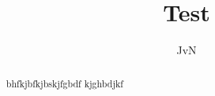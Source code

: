 \documentclass[]{article}
\title{Test}
\author{JvN}
\begin{document}
\maketitle

\begin{abstract}
bhfkjbfkjbskjfgbdf kjghbdjkf
\end{abstract}

\section{}
\end{document}
